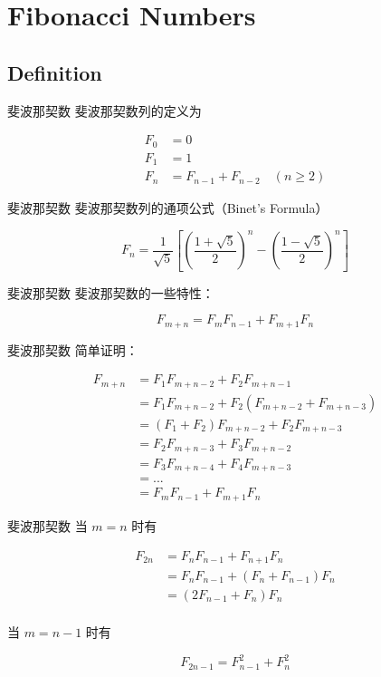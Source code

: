 \documentclass[12pt,aspectratio=169,handout]{beamer}
\begin{document}
\section[斐波那契数]{Fibonacci Numbers}

\subsection[斐波那契数]{Definition}

\begin{frame}[fragile]{斐波那契数}
斐波那契数列的定义为

$$
\begin{aligned}
F_0 &= 0 \\
F_1 &= 1 \\
F_n &= F_{n-1} + F_{n-2} \quad (n \ge 2)
\end{aligned}
$$
\end{frame}

\begin{frame}[fragile]{斐波那契数}
斐波那契数列的通项公式（Binet's Formula）

$$
F_n = \frac{1}{\sqrt{5}}\left[\left(\frac{1+\sqrt{5}}{2}\right)^n - \left(\frac{1-\sqrt{5}}{2}\right)^n\right]
$$
\end{frame}

\begin{frame}[fragile]{斐波那契数}
斐波那契数的一些特性：

$$
F_{m+n} = F_{m} F_{n-1} + F_{m+1} F_{n}
$$
\end{frame}

\begin{frame}[fragile]{斐波那契数}
简单证明：

$$
\begin{aligned}
F_{m+n} &= F_{1} F_{m+n-2} + F_{2} F_{m+n-1} \\
&= F_{1} F_{m+n-2} + F_{2} (F_{m+n-2} + F_{m+n-3}) \\
&= (F_{1} + F_{2}) F_{m+n-2} + F_{2} F_{m+n-3} \\
&= F_{2} F_{m+n-3} + F_{3} F_{m+n-2} \\
&= F_{3} F_{m+n-4} + F_{4} F_{m+n-3} \\
&= ... \\
&= F_{m} F_{n-1} + F_{m+1} F_{n}
\end{aligned}
$$
\end{frame}

\begin{frame}[fragile]{斐波那契数}
  当 $m = n$ 时有

  $$
  \begin{aligned}
  F_{2n} &= F_{n} F_{n-1} + F_{n+1} F_{n} \\
  &= F_{n} F_{n-1} + (F_{n} + F_{n-1}) F_{n} \\
  &= (2 F_{n-1} + F_{n}) F_{n} \\
  \end{aligned}
  $$

  当 $m = n-1$ 时有

  $$
  F_{2n-1} = F_{n-1}^2 + F_{n}^2
  $$
\end{frame}
\end{document}

